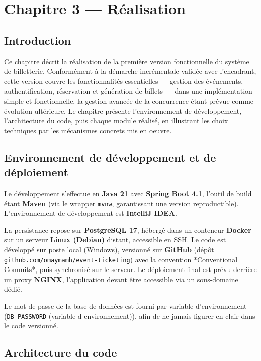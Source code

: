 \documentclass[12pt,a4paper]{report}
\newcommand{\code}[1]{\textcolor{codecolor}{\texttt{#1}}}
\begin{document}
\chapter{Chapitre 3 — Réalisation}

\section{Introduction}

Ce chapitre décrit la réalisation de la première version fonctionnelle du système de billetterie. Conformément à la démarche incrémentale validée avec l'encadrant, cette version couvre les fonctionnalités essentielles — gestion des événements, authentification, réservation et génération de billets — dans une implémentation simple et fonctionnelle, la gestion avancée de la concurrence étant prévue comme évolution ultérieure. Le chapitre présente l'environnement de développement, l'architecture du code, puis chaque module réalisé, en illustrant les choix techniques par les mécanismes concrets mis en oeuvre.

\section{Environnement de développement et de déploiement}

Le développement s'effectue en \textbf{Java 21} avec \textbf{Spring Boot 4.1}, l'outil de build étant \textbf{Maven} (via le wrapper \code{mvnw}, garantissant une version reproductible). L'environnement de développement est \textbf{IntelliJ IDEA}.

La persistance repose sur \textbf{PostgreSQL 17}, hébergé dans un conteneur \textbf{Docker} sur un serveur \textbf{Linux (Debian)} distant, accessible en SSH. Le code est développé sur poste local (Windows), versionné sur \textbf{GitHub} (dépôt \code{github.com/omaymamh/event-ticketing}) avec la convention *Conventional Commits*, puis synchronisé sur le serveur. Le déploiement final est prévu derrière un proxy \textbf{NGINX}, l'application devant être accessible via un sous-domaine dédié.

Le mot de passe de la base de données est fourni par variable d'environnement (\code{DB\_PASSWORD} (variable d environnement)), afin de ne jamais figurer en clair dans le code versionné.

\section{Architecture du code}
\end{document}

